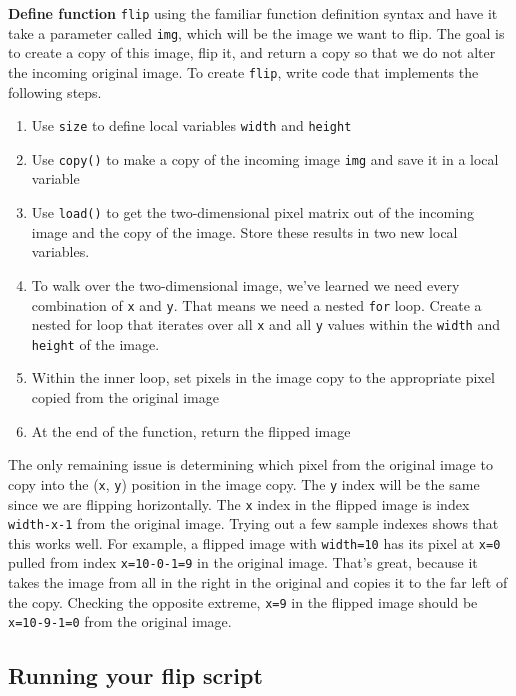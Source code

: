 {\bf Define function} {\tt flip} using the familiar function definition syntax and have it take a parameter called {\tt img}, which will be the image we want to flip. The goal is to create a copy of this image, flip it, and return a copy so that we do not alter the incoming original image. To create {\tt flip}, write code that implements the following steps.

\begin{enumerate}
\item Use {\tt size} to define local variables {\tt width} and {\tt height}
\item Use {\tt copy()} to make a copy of the incoming image {\tt img} and save it in a local variable
\item Use {\tt load()} to get the two-dimensional pixel matrix out of the incoming image and the copy of the image. Store these results in two new local variables.
\item To walk over the two-dimensional image, we've learned we need every combination of {\tt x} and {\tt y}. That means we need a nested {\tt for} loop. Create a nested for loop that iterates over all {\tt x} and all {\tt y} values within the {\tt width} and {\tt height} of the image.
\item Within the inner loop, set pixels in the image copy to the appropriate pixel copied from the original image
\item At the end of the function, return the flipped image
\end{enumerate}

The only remaining issue is determining which pixel from the original image to copy into the ({\tt x}, {\tt y}) position in the image copy. The {\tt y} index will be the same since we are flipping horizontally. The {\tt x} index in the flipped image is index {\tt width-x-1} from the original image. Trying out a few sample indexes shows that this works well. For example, a flipped image with {\tt width=10} has its pixel at {\tt x=0} pulled from index {\tt x=10-0-1=9} in the original image. That's great, because it takes the image from all in the right in the original and copies it to the far left of the copy. Checking the opposite extreme, {\tt x=9} in the flipped image should be {\tt x=10-9-1=0} from the original image.

\subsection{Running your flip script}

